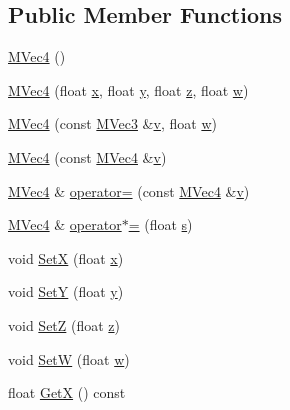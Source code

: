 \subsection*{Public Member Functions}
\begin{CompactItemize}
\item 
\hyperlink{class_m_vec4_8a5c04d8d382c02fc255e5810fc322dc}{MVec4} ()
\item 
\hyperlink{class_m_vec4_f74c7ed14ca46995ad7d039233d29c10}{MVec4} (float \hyperlink{wglext_8h_d77deca22f617d3f0e0eb786445689fc}{x}, float \hyperlink{wglext_8h_9298c7ad619074f5285b32c6b72bfdea}{y}, float \hyperlink{glext__bak_8h_5b27107fca91cf19a778530405575b37}{z}, float \hyperlink{glext__bak_8h_d47d000a8e40b26a33682e10ae32a1b6}{w})
\item 
\hyperlink{class_m_vec4_d0b73fac9c63679a567eee1dcacbb47f}{MVec4} (const \hyperlink{class_m_vec3}{MVec3} \&\hyperlink{glext__bak_8h_5cf89b94f7478c0ebc4429b60e7ef93b}{v}, float \hyperlink{glext__bak_8h_d47d000a8e40b26a33682e10ae32a1b6}{w})
\item 
\hyperlink{class_m_vec4_af4fbbbfafe3fa744904ffd3a00aaebd}{MVec4} (const \hyperlink{class_m_vec4}{MVec4} \&\hyperlink{glext__bak_8h_5cf89b94f7478c0ebc4429b60e7ef93b}{v})
\item 
\hyperlink{class_m_vec4}{MVec4} \& \hyperlink{class_m_vec4_ad49be52b3a9700dca53ee4f98adb939}{operator=} (const \hyperlink{class_m_vec4}{MVec4} \&\hyperlink{glext__bak_8h_5cf89b94f7478c0ebc4429b60e7ef93b}{v})
\item 
\hyperlink{class_m_vec4}{MVec4} \& \hyperlink{class_m_vec4_2e7a5d6567a19a2fc4180ae087bf0065}{operator$\ast$=} (float \hyperlink{glext__bak_8h_d585a1393cfa368fa9dc3d8ebff640d5}{s})
\item 
void \hyperlink{class_m_vec4_932107856bc0fa095314f3f0d509b6ad}{SetX} (float \hyperlink{wglext_8h_d77deca22f617d3f0e0eb786445689fc}{x})
\item 
void \hyperlink{class_m_vec4_d887bfc35b445c716dfc6083ee23ba1c}{SetY} (float \hyperlink{wglext_8h_9298c7ad619074f5285b32c6b72bfdea}{y})
\item 
void \hyperlink{class_m_vec4_1f9eddb57a0fc49bcf4f90b5378ddd2a}{SetZ} (float \hyperlink{glext__bak_8h_5b27107fca91cf19a778530405575b37}{z})
\item 
void \hyperlink{class_m_vec4_c505914a9151b362d6d73cbe509fac4a}{SetW} (float \hyperlink{glext__bak_8h_d47d000a8e40b26a33682e10ae32a1b6}{w})
\item 
float \hyperlink{class_m_vec4_18e1347de288266430d0a8933b563f44}{GetX} () const 

\end{CompactItemize}

